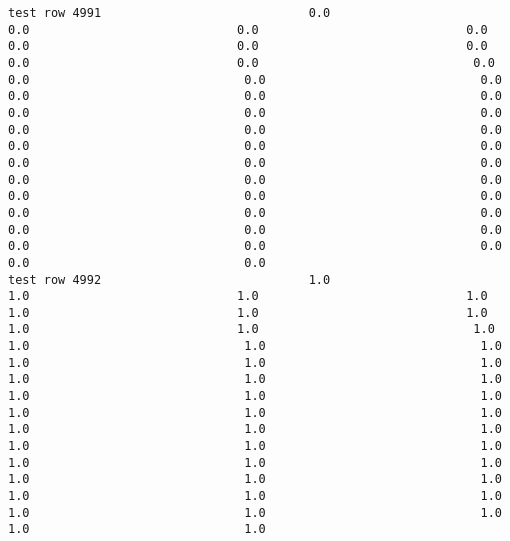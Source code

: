 \documentclass[11pt]{article}
\begin{document}
\begin{verbatim}
test row 4991                             0.0                             0.0                             0.0                             0.0                             0.0                             0.0                             0.0                             0.0                             0.0                              0.0                              0.0                              0.0                              0.0                              0.0                              0.0                              0.0                              0.0                              0.0                              0.0                              0.0                              0.0                              0.0                              0.0                              0.0                              0.0                              0.0                              0.0                              0.0                              0.0                              0.0                              0.0                              0.0                              0.0                              0.0                              0.0                              0.0                              0.0                              0.0                              0.0                              0.0                              0.0                              0.0                              0.0                              0.0                              0.0
test row 4992                             1.0                             1.0                             1.0                             1.0                             1.0                             1.0                             1.0                             1.0                             1.0                              1.0                              1.0                              1.0                              1.0                              1.0                              1.0                              1.0                              1.0                              1.0                              1.0                              1.0                              1.0                              1.0                              1.0                              1.0                              1.0                              1.0                              1.0                              1.0                              1.0                              1.0                              1.0                              1.0                              1.0                              1.0                              1.0                              1.0                              1.0                              1.0                              1.0                              1.0                              1.0                              1.0                              1.0                              1.0                              1.0

\end{verbatim}
\end{document}
